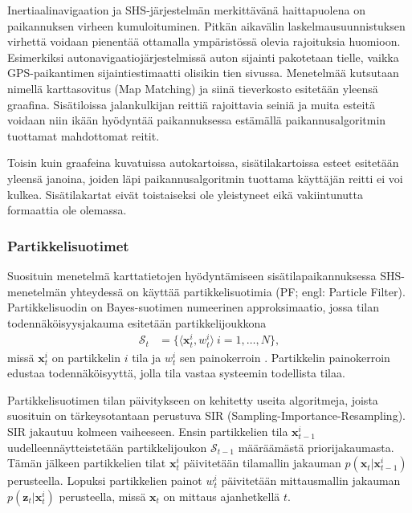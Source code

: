 Inertiaalinavigaation ja SHS-järjestelmän merkittävänä haittapuolena on
paikannuksen virheen kumuloituminen. Pitkän aikavälin laskelmausuunnistuksen
virhettä voidaan pienentää ottamalla ympäristössä olevia rajoituksia
huomioon. Esimerkiksi autonavigaatiojärjestelmissä auton sijainti pakotetaan
tielle, vaikka GPS-paikantimen sijaintiestimaatti olisikin tien sivussa.
Menetelmää kutsutaan nimellä karttasovitus (Map Matching) ja siinä
tieverkosto esitetään yleensä graafina. Sisätiloissa jalankulkijan reittiä
rajoittavia seiniä ja muita esteitä voidaan niin ikään hyödyntää paikannuksessa
estämällä paikannusalgoritmin tuottamat mahdottomat reitit.

Toisin kuin graafeina kuvatuissa autokartoissa, sisätilakartoissa esteet
esitetään yleensä janoina, joiden läpi paikannusalgoritmin tuottama käyttäjän
reitti ei voi kulkea. Sisätilakartat eivät toistaiseksi ole yleistyneet
eikä vakiintunutta formaattia ole olemassa.

\subsubsection{Partikkelisuotimet}

Suosituin menetelmä karttatietojen hyödyntämiseen sisätilapaikannuksessa
SHS-menetelmän yhteydessä
on käyttää partikkelisuotimia (PF; engl: Particle Filter).
Partikkelisuodin on Bayes-suotimen numeerinen approksimaatio, jossa
tilan todennäköisyysjakauma esitetään partikkelijoukkona
\begin{align}
\mathcal{S}_t &= \{\langle\mathbf{x}_t^i,w_t^i\rangle \ i = 1,\ldots,N\},
\end{align}
missä $\mathbf{x}_t^i$ on partikkelin $i$ tila ja $w_t^i$ sen painokerroin
\cite{woodman2010}.
Partikkelin painokerroin edustaa todennäköisyyttä, jolla tila vastaa
systeemin todellista tilaa.

Partikkelisuotimen tilan päivitykseen on kehitetty useita algoritmeja,
joista suosituin on tärkeysotantaan perustuva SIR
(Sampling-Importance-Resampling). SIR jakautuu kolmeen vaiheeseen.
Ensin partikkelien tila $\mathbf{x}_{t-1}^i$ uudelleennäytteistetään
partikkelijoukon $\mathcal{S}_{t-1}$
määräämästä priorijakaumasta. Tämän jälkeen partikkelien tilat
$\mathbf{x}_t^i$ päivitetään tilamallin jakauman
$p(\mathbf{x}_t | \mathbf{x}_{t-1}^i)$ perusteella. Lopuksi 
partikkelien painot $w_t^i$ päivitetään mittausmallin jakauman
$p(\mathbf{z}_t | \mathbf{x}_t^i)$ perusteella, missä
$\mathbf{x}_t$ on mittaus ajanhetkellä $t$.

